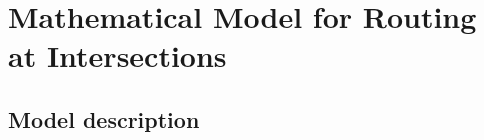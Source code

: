 




\chapter{Mathematical Model for Routing at Intersections} \label{sec:model}




\section{Model description} \label{description}

